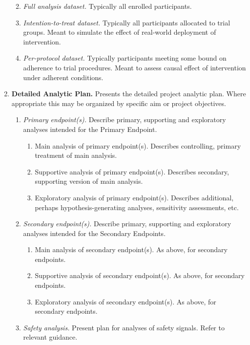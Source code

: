 \documentclass[]{book}
\providecommand{\tightlist}{%
  \setlength{\itemsep}{0pt}\setlength{\parskip}{0pt}}
\theoremstyle{definition}
\theoremstyle{definition}
\theoremstyle{definition}
\theoremstyle{remark}
\begin{document}
\begin{enumerate}
  \begin{enumerate}
  \def\labelenumii{\alph{enumii}.}
  \tightlist
  \item
    \emph{Full analysis dataset.} Typically all enrolled participants.
  \item
    \emph{Intention-to-treat dataset.} Typically all participants
    allocated to trial groups. Meant to simulate the effect of
    real-world deployment of intervention.
  \item
    \emph{Per-protocol dataset.} Typically participants meeting some
    bound on adherence to trial procedures. Meant to assess causal
    effect of intervention under adherent conditions.
  \end{enumerate}
\item
  \textbf{Detailed Analytic Plan.} Presents the detailed project
  analytic plan. Where appropriate this may be organized by specific aim
  or project objectives.

  \begin{enumerate}
  \def\labelenumii{\alph{enumii}.}
  \tightlist
  \item
    \emph{Primary endpoint(s).} Describe primary, supporting and
    exploratory analyses intended for the Primary Endpoint.

    \begin{enumerate}
    \def\labelenumiii{\roman{enumiii}.}
    \tightlist
    \item
      Main analysis of primary endpoint(s). Describes controlling,
      primary treatment of main analysis.
    \item
      Supportive analysis of primary endpoint(s). Describes secondary,
      supporting version of main analysis.
    \item
      Exploratory analysis of primary endpoint(s). Describes additional,
      perhaps hypothesis-generating analyses, sensitivity assessments,
      etc.
    \end{enumerate}
  \item
    \emph{Secondary endpoint(s).} Describe primary, supporting and
    exploratory analyses intended for the Secondary Endpoints.

    \begin{enumerate}
    \def\labelenumiii{\roman{enumiii}.}
    \tightlist
    \item
      Main analysis of secondary endpoint(s). As above, for secondary
      endpoints.
    \item
      Supportive analysis of secondary endpoint(s). As above, for
      secondary endpoints.
    \item
      Exploratory analysis of secondary endpoint(s). As above, for
      secondary endpoints.
    \end{enumerate}
  \item
    \emph{Safety analysis.} Present plan for analyses of safety signals.
    Refer to relevant guidance.


\end{enumerate}
\end{enumerate}
\end{document}
